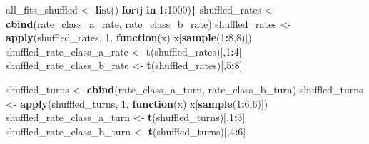 \documentclass[
]{article}
\newenvironment{Shaded}{\begin{snugshade}}{\end{snugshade}}
\newcommand{\ControlFlowTok}[1]{\textcolor[rgb]{0.13,0.29,0.53}{\textbf{#1}}}
\newcommand{\DecValTok}[1]{\textcolor[rgb]{0.00,0.00,0.81}{#1}}
\newcommand{\FunctionTok}[1]{\textcolor[rgb]{0.13,0.29,0.53}{\textbf{#1}}}
\newcommand{\NormalTok}[1]{#1}
\newcommand{\OtherTok}[1]{\textcolor[rgb]{0.56,0.35,0.01}{#1}}
\newcommand{\SpecialCharTok}[1]{\textcolor[rgb]{0.81,0.36,0.00}{\textbf{#1}}}
\begin{document}
\begin{Shaded}
\begin{Highlighting}[]
\NormalTok{all\_fits\_shuffled }\OtherTok{\textless{}{-}} \FunctionTok{list}\NormalTok{()}
\ControlFlowTok{for}\NormalTok{(j }\ControlFlowTok{in} \DecValTok{1}\SpecialCharTok{:}\DecValTok{1000}\NormalTok{)\{}
\NormalTok{  shuffled\_rates }\OtherTok{\textless{}{-}} \FunctionTok{cbind}\NormalTok{(rate\_class\_a\_rate, rate\_class\_b\_rate)}
\NormalTok{  shuffled\_rates }\OtherTok{\textless{}{-}} \FunctionTok{apply}\NormalTok{(shuffled\_rates, }\DecValTok{1}\NormalTok{, }
                          \ControlFlowTok{function}\NormalTok{(x) x[}\FunctionTok{sample}\NormalTok{(}\DecValTok{1}\SpecialCharTok{:}\DecValTok{8}\NormalTok{,}\DecValTok{8}\NormalTok{)])}
\NormalTok{  shuffled\_rate\_class\_a\_rate }\OtherTok{\textless{}{-}} \FunctionTok{t}\NormalTok{(shuffled\_rates)[,}\DecValTok{1}\SpecialCharTok{:}\DecValTok{4}\NormalTok{]}
\NormalTok{  shuffled\_rate\_class\_b\_rate }\OtherTok{\textless{}{-}} \FunctionTok{t}\NormalTok{(shuffled\_rates)[,}\DecValTok{5}\SpecialCharTok{:}\DecValTok{8}\NormalTok{]}
  
  
\NormalTok{  shuffled\_turns }\OtherTok{\textless{}{-}} \FunctionTok{cbind}\NormalTok{(rate\_class\_a\_turn, rate\_class\_b\_turn)}
\NormalTok{  shuffled\_turns }\OtherTok{\textless{}{-}} \FunctionTok{apply}\NormalTok{(shuffled\_turns, }\DecValTok{1}\NormalTok{, }
                          \ControlFlowTok{function}\NormalTok{(x) x[}\FunctionTok{sample}\NormalTok{(}\DecValTok{1}\SpecialCharTok{:}\DecValTok{6}\NormalTok{,}\DecValTok{6}\NormalTok{)])}
\NormalTok{  shuffled\_rate\_class\_a\_turn }\OtherTok{\textless{}{-}} \FunctionTok{t}\NormalTok{(shuffled\_turns)[,}\DecValTok{1}\SpecialCharTok{:}\DecValTok{3}\NormalTok{]}
\NormalTok{  shuffled\_rate\_class\_b\_turn }\OtherTok{\textless{}{-}} \FunctionTok{t}\NormalTok{(shuffled\_turns)[,}\DecValTok{4}\SpecialCharTok{:}\DecValTok{6}\NormalTok{]}
  

\end{Highlighting}
\end{Shaded}
\end{document}
